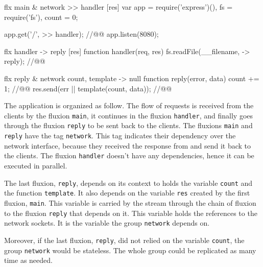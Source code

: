 
\begin{code}[flx, caption={Example application expressed in the high-level fluxional language}, label={lst:fluxional}]
flx main & network
>> handler [res]
  var app = require('express')(),
      fs = require('fs'),
      count = 0;

  app.get('/', >> handler); //@\label{lst:fluxional-streamtohandler}@
  app.listen(8080);

flx handler
-> reply [res]
  function handler(req, res) {
    fs.readFile(__filename, -> reply); //@\label{lst:fluxional-readfile}@
  }

flx reply & network {count, template}
-> null
  function reply(error, data) {
    count += 1; //@\label{lst:fluxional-counter}@
    res.send(err || template(count, data)); //@\label{lst:fluxional-ressend}@
  }
\end{code}

The application is organized as follow.
The flow of requests is received from the clients by the fluxion \texttt{main}, it continues in the fluxion \texttt{handler}, and finally goes through the fluxion \texttt{reply} to be sent back to the clients.
The fluxions \texttt{main} and \texttt{reply} have the tag \texttt{network}.
This tag indicates their dependency over the network interface, because they  received the response from and send it back to the clients.
The fluxion \texttt{handler} doesn't have any dependencies, hence it can be executed in parallel.

The last fluxion, \texttt{reply}, depends on its context to holds the variable \texttt{count} and the function \texttt{template}.
It also depends on the variable \texttt{res} created by the first fluxion, \texttt{main}.
This variable is carried by the stream through the chain of fluxion to the fluxion \texttt{reply} that depends on it.
This variable holds the references to the network sockets.
It is the variable the group \texttt{network} depends on.

Moreover, if the last fluxion, \texttt{reply}, did not relied on the variable \texttt{count}, the group \texttt{network} would be stateless.
The whole group could be replicated as many time as needed. %

